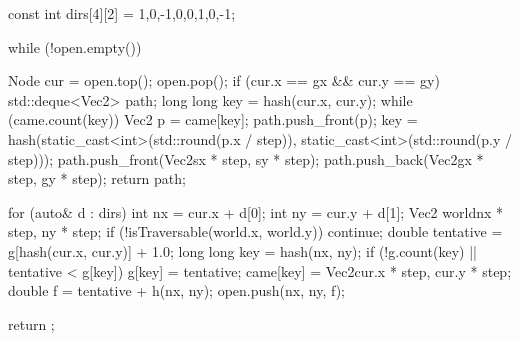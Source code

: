 \documentclass[10pt,letterpaper]{jsarticle}
\begin{document}
\begin{cppcode}
{    const int dirs[4][2] = {{1,0},{-1,0},{0,1},{0,-1}};

    while (!open.empty()) {
        Node cur = open.top();
        open.pop();
        if (cur.x == gx && cur.y == gy) {
            std::deque<Vec2> path;
            long long key = hash(cur.x, cur.y);
            while (came.count(key)) {
                Vec2 p = came[key];
                path.push_front(p);
                key = hash(static_cast<int>(std::round(p.x / step)),
                           static_cast<int>(std::round(p.y / step)));
            }
            path.push_front(Vec2{sx * step, sy * step});
            path.push_back(Vec2{gx * step, gy * step});
            return path;
        }

        for (auto& d : dirs) {
            int nx = cur.x + d[0];
            int ny = cur.y + d[1];
            Vec2 world{nx * step, ny * step};
            if (!isTraversable(world.x, world.y)) continue;
            double tentative = g[hash(cur.x, cur.y)] + 1.0;
            long long key = hash(nx, ny);
            if (!g.count(key) || tentative < g[key]) {
                g[key] = tentative;
                came[key] = Vec2{cur.x * step, cur.y * step};
                double f = tentative + h(nx, ny);
                open.push({nx, ny, f});
            }
        }
    }
    return {};
}


\end{cppcode}
\end{document}

